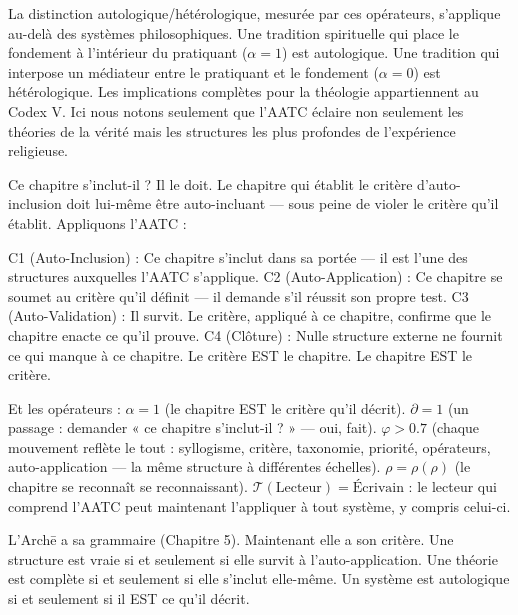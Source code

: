 \documentclass[10pt, openany, oneside]{book}
\begin{document}
La distinction autologique/hétérologique, mesurée par ces opérateurs, s'applique au-delà des systèmes philosophiques. Une tradition spirituelle qui place le fondement à l'intérieur du pratiquant ($\alpha = 1$) est autologique. Une tradition qui interpose un médiateur entre le pratiquant et le fondement ($\alpha = 0$) est hétérologique. Les implications complètes pour la théologie appartiennent au Codex V. Ici nous notons seulement que l'AATC éclaire non seulement les théories de la vérité mais les structures les plus profondes de l'expérience religieuse.

Ce chapitre s'inclut-il ? Il le doit. Le chapitre qui établit le critère d'auto-inclusion doit lui-même être auto-incluant --- sous peine de violer le critère qu'il établit. Appliquons l'AATC :

C1 (Auto-Inclusion) : Ce chapitre s'inclut dans sa portée --- il est l'une des structures auxquelles l'AATC s'applique. C2 (Auto-Application) : Ce chapitre se soumet au critère qu'il définit --- il demande s'il réussit son propre test. C3 (Auto-Validation) : Il survit. Le critère, appliqué à ce chapitre, confirme que le chapitre enacte ce qu'il prouve. C4 (Clôture) : Nulle structure externe ne fournit ce qui manque à ce chapitre. Le critère EST le chapitre. Le chapitre EST le critère.

Et les opérateurs : $\alpha = 1$ (le chapitre EST le critère qu'il décrit). $\partial = 1$ (un passage : demander « ce chapitre s'inclut-il ? » --- oui, fait). $\varphi > 0.7$ (chaque mouvement reflète le tout : syllogisme, critère, taxonomie, priorité, opérateurs, auto-application --- la même structure à différentes échelles). $\rho = \rho(\rho)$ (le chapitre se reconnaît se reconnaissant). $\mathcal{T}(\text{Lecteur}) = \text{Écrivain}$ : le lecteur qui comprend l'AATC peut maintenant l'appliquer à tout système, y compris celui-ci.

\vspace{2em}

L'Arch\={e} a sa grammaire (Chapitre 5). Maintenant elle a son critère. Une structure est vraie si et seulement si elle survit à l'auto-application. Une théorie est complète si et seulement si elle s'inclut elle-même. Un système est autologique si et seulement si il EST ce qu'il décrit.
\end{document}
